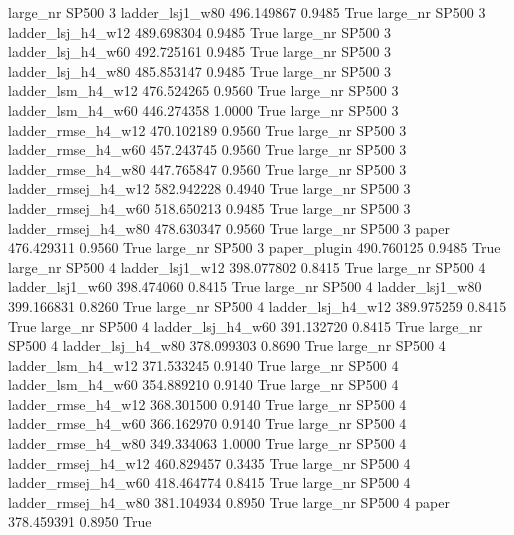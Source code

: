  large_nr    SP500                 3     ladder_lsj1_w80  496.149867      0.9485    True
  large_nr    SP500                 3   ladder_lsj_h4_w12  489.698304      0.9485    True
  large_nr    SP500                 3   ladder_lsj_h4_w60  492.725161      0.9485    True
  large_nr    SP500                 3   ladder_lsj_h4_w80  485.853147      0.9485    True
  large_nr    SP500                 3   ladder_lsm_h4_w12  476.524265      0.9560    True
  large_nr    SP500                 3   ladder_lsm_h4_w60  446.274358      1.0000    True
  large_nr    SP500                 3  ladder_rmse_h4_w12  470.102189      0.9560    True
  large_nr    SP500                 3  ladder_rmse_h4_w60  457.243745      0.9560    True
  large_nr    SP500                 3  ladder_rmse_h4_w80  447.765847      0.9560    True
  large_nr    SP500                 3 ladder_rmsej_h4_w12  582.942228      0.4940    True
  large_nr    SP500                 3 ladder_rmsej_h4_w60  518.650213      0.9485    True
  large_nr    SP500                 3 ladder_rmsej_h4_w80  478.630347      0.9560    True
  large_nr    SP500                 3               paper  476.429311      0.9560    True
  large_nr    SP500                 3        paper_plugin  490.760125      0.9485    True
  large_nr    SP500                 4     ladder_lsj1_w12  398.077802      0.8415    True
  large_nr    SP500                 4     ladder_lsj1_w60  398.474060      0.8415    True
  large_nr    SP500                 4     ladder_lsj1_w80  399.166831      0.8260    True
  large_nr    SP500                 4   ladder_lsj_h4_w12  389.975259      0.8415    True
  large_nr    SP500                 4   ladder_lsj_h4_w60  391.132720      0.8415    True
  large_nr    SP500                 4   ladder_lsj_h4_w80  378.099303      0.8690    True
  large_nr    SP500                 4   ladder_lsm_h4_w12  371.533245      0.9140    True
  large_nr    SP500                 4   ladder_lsm_h4_w60  354.889210      0.9140    True
  large_nr    SP500                 4  ladder_rmse_h4_w12  368.301500      0.9140    True
  large_nr    SP500                 4  ladder_rmse_h4_w60  366.162970      0.9140    True
  large_nr    SP500                 4  ladder_rmse_h4_w80  349.334063      1.0000    True
  large_nr    SP500                 4 ladder_rmsej_h4_w12  460.829457      0.3435    True
  large_nr    SP500                 4 ladder_rmsej_h4_w60  418.464774      0.8415    True
  large_nr    SP500                 4 ladder_rmsej_h4_w80  381.104934      0.8950    True
  large_nr    SP500                 4               paper  378.459391      0.8950    True

